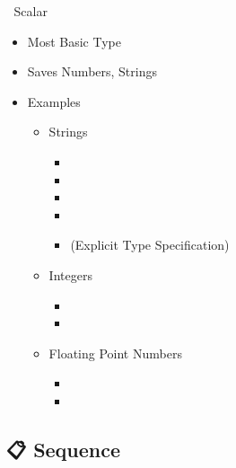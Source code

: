 \documentclass{beamer}
\begin{document}
\begin{frame}[fragile]{📏 Scalar}
  \begin{itemize}
    \item Most Basic Type
    \item Saves Numbers, Strings
    \item Examples
    \begin{itemize}
      \item Strings
      \begin{itemize}
        \item {}
        \item {}
        \item {}
        \item {}
        \item {} (Explicit Type Specification)
      \end{itemize}
      \item Integers
      \begin{itemize}
        \item {}
        \item {}
      \end{itemize}
      \item Floating Point Numbers
      \begin{itemize}
        \item {}
        \item {}
      \end{itemize}
    \end{itemize}
  \end{itemize}
\end{frame}

\subsection{📋 Sequence}
\end{document}

